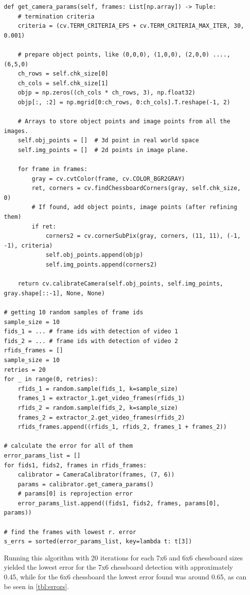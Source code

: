 \begin{lstlisting}[caption={Finding camera parameters with lowest error}, label={lst:cameraparams},float,floatplacement=H]
def get_camera_params(self, frames: List[np.array]) -> Tuple:
    # termination criteria
    criteria = (cv.TERM_CRITERIA_EPS + cv.TERM_CRITERIA_MAX_ITER, 30, 0.001)

    # prepare object points, like (0,0,0), (1,0,0), (2,0,0) ....,(6,5,0)
    ch_rows = self.chk_size[0]
    ch_cols = self.chk_size[1]
    objp = np.zeros((ch_cols * ch_rows, 3), np.float32)
    objp[:, :2] = np.mgrid[0:ch_rows, 0:ch_cols].T.reshape(-1, 2)

    # Arrays to store object points and image points from all the images.
    self.obj_points = []  # 3d point in real world space
    self.img_points = []  # 2d points in image plane.

    for frame in frames:
        gray = cv.cvtColor(frame, cv.COLOR_BGR2GRAY)
        ret, corners = cv.findChessboardCorners(gray, self.chk_size, 0)
        # If found, add object points, image points (after refining them)
        if ret:
            corners2 = cv.cornerSubPix(gray, corners, (11, 11), (-1, -1), criteria)
            self.obj_points.append(objp)
            self.img_points.append(corners2)

    return cv.calibrateCamera(self.obj_points, self.img_points, gray.shape[::-1], None, None)

# getting 10 random samples of frame ids
sample_size = 10
fids_1 = ... # frame ids with detection of video 1
fids_2 = ... # frame ids with detection of video 2
rfids_frames = []
sample_size = 10
retries = 20
for _ in range(0, retries):
    rfids_1 = random.sample(fids_1, k=sample_size)
    frames_1 = extractor_1.get_video_frames(rfids_1)
    rfids_2 = random.sample(fids_2, k=sample_size)
    frames_2 = extractor_2.get_video_frames(rfids_2)
    rfids_frames.append((rfids_1, rfids_2, frames_1 + frames_2))

# calculate the error for all of them
error_params_list = []
for fids1, fids2, frames in rfids_frames:
    calibrator = CameraCalibrator(frames, (7, 6))
    params = calibrator.get_camera_params()
    # params[0] is reprojection error
    error_params_list.append((fids1, fids2, frames, params[0], params))

# find the frames with lowest r. error
s_errs = sorted(error_params_list, key=lambda t: t[3])
\end{lstlisting}

Running this algorithm with 20 iterations for each 7x6 and 6x6 chessboard sizes yielded the lowest error for the 7x6 chessboard detection with approximately 0.45, while for the 6x6 chessboard the lowest error found was around 0.65, as can be seen in \autoref{tbl:errors}.

